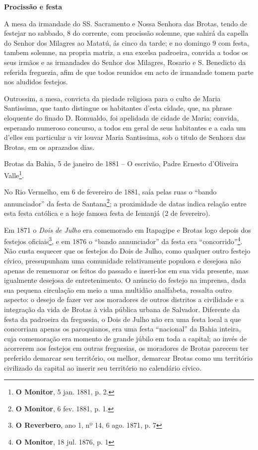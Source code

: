 \begin{citacao}
\textbf{Procissão e festa}

A mesa da irmandade do SS. Sacramento e Nossa Senhora das Brotas, tendo de festejar no sabbado, 8 do corrente, com procissão solemne, que sahirá da capella do Senhor dos Milagres ao Matatú, ás cinco da tarde; e no domingo 9 com festa, tambem solemne, na propria matriz, a sua excelsa padroeira, convida a todos os seus irmãos e as irmandades do Senhor dos Milagres, Rosario e S. Benedicto da referida freguezia, afim de que todos reunidos em acto de irmandade tomem parte nos aludidos festejos.

Outrossim, a mesa, convicta da piedade religiosa para o culto de Maria Santissima, que tanto distingue os habitantes d'esta cidade, que, na phrase eloquente do finado D. Romualdo, foi apelidada de cidade de Maria; convida, esperando numeroso concurso, a todos em geral de seus habitantes e a cada um d'elles em particular a vir louvar Maria Santissima, sob o titulo de Senhora das Brotas, em os aprazados dias.

Brotas da Bahia, 5 de janeiro de 1881 -- O escrivão, Padre Ernesto d'Oliveira Valle\footnote{\textbf{O Monitor}, 5 jan. 1881, p. 2.}.
\end{citacao}

No Rio Vermelho, em 6 de fevereiro de 1881, saía pelas ruas o ``bando annunciador'' da festa de Santana\footnote{\textbf{O Monitor}, 6 fev. 1881, p. 1.}; a proximidade de datas indica relação entre esta festa católica e a hoje famosa festa de Iemanjá (2 de fevereiro).

Em 1871 o \textit{Dois de Julho} era comemorado em Itapagipe e Brotas logo depois dos festejos oficiais\footnote{\textbf{O Reverbero}, ano 1, nº 14, 6 ago. 1871, p. 7}, e em 1876 o ``bando annunciador'' da festa era ``concorrido''\footnote{\textbf{O Monitor}, 18 jul. 1876, p. 1}. Não custa esquecer que os festejos do Dois de Julho, como qualquer outro festejo cívico, pressupunham uma comunidade relativamente populosa e desejosa não apenas de rememorar os feitos do passado e inseri-los em sua vida presente, mas igualmente desejosa de entretenimento. O anúncio do festejo na imprensa, dada sua pequena circulação em meio a uma multidão analfabeta, ressalta outro aspecto: o desejo de fazer ver aos moradores de outros distritos a civilidade e a integração da vida de Brotas à vida pública urbana de Salvador. Diferente da festa da padroeira da freguesia, o Dois de Julho não era uma festa local a que concorriam apenas os paroquianos, era uma festa ``nacional'' da Bahia inteira, cuja comemoração era momento de grande júbilo em toda a capital; ao invés de acorrerem aos festejos em outras freguesias, os moradores de Brotas parecem ter preferido demarcar seu território, ou melhor, demarcar Brotas como um território civilizado da capital ao inserir seu território no calendário cívico.

